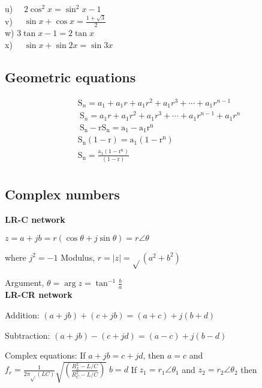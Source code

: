 \documentclass[10pt]{article}
\begin{document}
u) $\quad 2 \cos ^2 x=\sin ^2 x-1$\\

v) $\quad \sin x+\cos x=\frac{1+\sqrt{3}}{2}$\\

w) $3 \tan x-1=2 \tan x$\\

x) $\quad \sin x+\sin 2 x=\sin 3 x$


\subsection{Geometric equations}

$$
\begin{aligned}
&\mathrm{S}_n=a_1+a_1 r+a_1 r^2+a_1 r^3+\cdots+a_1 r^{n-1} \\

&\mathrm{~S}_n=a_1 r+a_1 r^2+a_1 r^3+\cdots+a_1 r^{n-1}+a_1 r^n \\

&\mathrm{~S}_{\mathrm{n}}-\mathrm{rS}_{\mathrm{n}}=\mathrm{a}_1-\mathrm{a}_1 \mathrm{r}^{\mathrm{n}} \\

&\mathrm{S}_{\mathrm{n}}(1-\mathrm{r})=\mathrm{a}_1\left(1-\mathrm{r}^{\mathrm{n}}\right) \\

&\mathrm{S}_{\mathrm{n}}=\frac{\mathrm{a}_1\left(1-\mathrm{r}^{\mathrm{n}}\right)}{(1-\mathrm{r})}\\

\end{aligned}
$$


\subsection{Complex numbers}

\textbf{LR-C network}

$z=a+j b=r(\cos \theta+j \sin \theta)=r \angle \theta$

where $j^2=-1$ Modulus, $r=|z|=\sqrt{ }\left(a^2+b^2\right)$

Argument, $\theta=\arg z=\tan ^{-1} \frac{b}{a}$\\


\textbf{LR-CR network}


Addition: $(a+j b)+(c+j b)=(a+c)+j(b+d)$

Subtraction: $(a+j b)-(c+j d)=(a-c)+j(b-d)$

Complex equations: If $a+j b=c+j d$, then $a=c$ and
$f_r=\frac{1}{2 \pi \sqrt{ }(L C)} \sqrt{\left(\frac{R_L^2-L / C}{R_C^2-L / C}\right)}$
$b=d$
If $z_1=r_1 \angle \theta_1$ and $z_2=r_2 \angle \theta_2$ then
\end{document}
